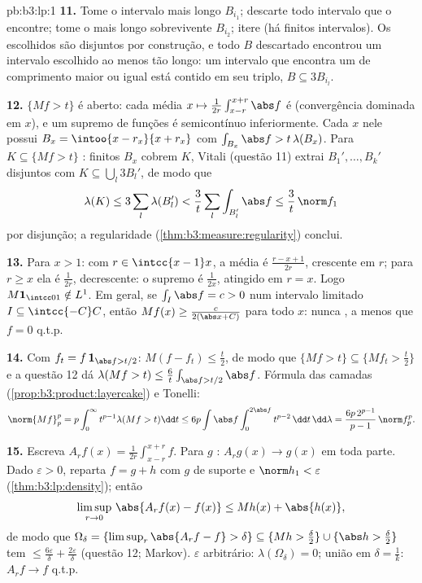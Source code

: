 \begin{solution}{pb:b3:lp:1}
\textbf{11.} Tome o intervalo mais longo $B_{i_1}$; descarte
todo intervalo que o encontre; tome o mais longo sobrevivente
$B_{i_2}$; itere (há finitos intervalos). Os escolhidos
são disjuntos por construção, e todo $B$ descartado encontrou um
intervalo escolhido ao menos tão longo: um intervalo que encontra um
de comprimento maior ou igual está contido em seu triplo, $B \subseteq
3B_{i_l}$.

\textbf{12.} $\{Mf > t\}$ é aberto: cada média $x \mapsto
\frac1{2r}\int_{x-r}^{x+r}\abs f$ é  (convergência
dominada em $x$), e um supremo de funções 
é semicontínuo inferiormente. Cada $x$ nele possui $B_x =
\intoo{x-r_x}{x+r_x}$ com $\int_{B_x}\abs f >
t\,\lambda(B_x)$. Para $K \subseteq \{Mf > t\}$ :
finitos $B_x$ cobrem $K$, Vitali (questão 11) extrai
$B_1', \dots, B_k'$ disjuntos com $K \subseteq
\bigcup_l3B_l'$, de modo que
\[
\lambda(K) \leq 3\sum_l\lambda(B_l') <
\frac3t\sum_l\int_{B_l'}\abs f \leq \frac3t\,\norm f_1
\]
por disjunção; a regularidade 
(\cref{thm:b3:measure:regularity}) conclui.

\textbf{13.} Para $x > 1$: com $r \in \intcc{x-1}x$, a
média é $\frac{r - x + 1}{2r}$, crescente em $r$; para $r
\geq x$ ela é $\frac1{2r}$, decrescente: o supremo é
$\frac1{2x}$, atingido em $r = x$. Logo $M\mathbf 1_{\intcc01}
\notin L^1$. Em geral, se $\int_I\abs f = c > 0$ num
intervalo limitado $I \subseteq \intcc{-C}C$, então $Mf(x) \geq
\frac{c}{2(\abs x + C)}$ para todo $x$: nunca ,
a menos que $f = 0$ q.t.p.

\textbf{14.} Com $f_t = f\,\mathbf 1_{\abs f > t/2}$:
$M(f - f_t) \leq \frac t2$, de modo que $\{Mf > t\} \subseteq \{Mf_t
> \frac t2\}$ e a questão 12 dá $\lambda(Mf > t) \leq
\frac6t\int_{\abs f > t/2}\abs f$. Fórmula das camadas
(\cref{prop:b3:product:layercake}) e Tonelli:
\[
\norm{Mf}_p^p = p\int_0^\infty t^{p-1}\lambda(Mf > t)\dd t
\leq 6p\int\abs f\int_0^{2\abs f}t^{p-2}\,\dd t\,\dd\lambda
= \frac{6p\,2^{p-1}}{p-1}\,\norm f_p^p .
\]

\textbf{15.} Escreva $A_rf(x) = \frac1{2r}\int_{x-r}^{x+r}f$.
Para $g$ : $A_rg(x) \to g(x)$ em toda parte. Dado
$\varepsilon > 0$, reparta $f = g + h$ com $g$  de
suporte  e $\norm h_1 < \varepsilon$
(\cref{thm:b3:lp:density}); então
\[
\limsup_{r\to0}\,\abs{A_rf(x) - f(x)} \leq Mh(x) +
\abs{h(x)},
\]
de modo que $\Omega_\delta = \{\limsup_r\abs{A_rf - f} > \delta\}
\subseteq \{Mh > \tfrac\delta2\} \cup \{\abs h >
\tfrac\delta2\}$ tem  $\leq \frac{6\varepsilon}\delta
+ \frac{2\varepsilon}\delta$ (questão 12; Markov).
$\varepsilon$ arbitrário: $\lambda(\Omega_\delta) = 0$; união
em $\delta = \frac1k$: $A_rf \to f$ q.t.p.


\end{solution}
